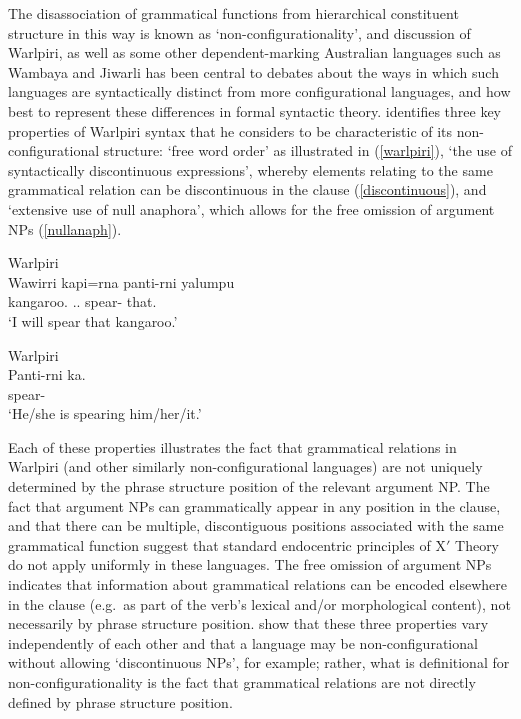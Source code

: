 \documentclass[output=paper,hidelinks]{langscibook}
\begin{document}
\noindent %
The disassociation of grammatical functions from hierarchical constituent structure in this way is known as `non-configurationality', and discussion of Warlpiri, as well as some other dependent-marking Australian languages such as Wambaya \citep{nordlinger1998constructive} and Jiwarli \citep{AustBres96,Austin01} has been central to debates about the ways in which such languages are syntactically distinct from more configurational languages, and how best to represent these differences in formal syntactic theory.  \citet{Hale83} identifies three key properties of Warlpiri syntax that he considers to be characteristic of its non-configurational structure: `free word order' as illustrated in (\ref{warlpiri}), `the use of syntactically discontinuous expressions', whereby elements relating to the same grammatical relation can be discontinuous in the clause (\ref{discontinuous}), and `extensive use of null anaphora', which allows for the free omission of argument NPs (\ref{nullanaph}).

\ea\label{ex:Australian:9} \label{discontinuous} Warlpiri\\
\gll Wawirri kapi=rna panti-rni yalumpu\\
{kangaroo.\ABS} {.\SG.\SBJ} {spear-\NPST} {that.\ABS}\\
\glt `I will spear that kangaroo.' \citep[6]{Hale83}
\z

\ea \label{nullanaph} Warlpiri\\
\gll Panti-rni ka.\\ 
{spear-\NPST} {\AUX}\\ 
\glt `He/she is spearing him/her/it.' \citep[7]{Hale83}
\z

Each of these properties illustrates the fact that grammatical relations in Warlpiri (and other similarly non-configurational languages) are not uniquely determined by the phrase structure position of the relevant argument NP. The fact that argument NPs can grammatically appear in any position in the clause, and that there can be multiple, discontiguous positions associated with the same grammatical function suggest that standard endocentric principles of X$'$ Theory do not apply uniformly in these languages. The free omission of argument NPs indicates that information about grammatical relations can be encoded elsewhere in the clause (e.g.\ as part of the verb's lexical and/or morphological content), not necessarily by phrase structure position. \citet{AustBres96} show that these three properties vary independently of each other and that a language may be non-configurational without allowing `discontinuous NPs', for example; rather, what is definitional for non-configurationality is the fact that grammatical relations are not directly defined by phrase structure position. 
\end{document}
